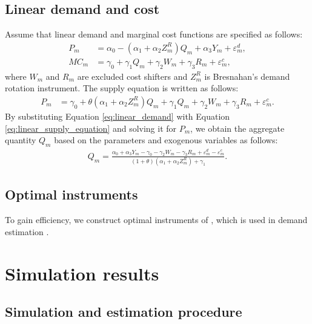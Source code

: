 \documentclass[11pt, a4paper]{article}
\begin{document}
\subsection{Linear demand and cost}
Assume that linear demand and marginal cost functions are specified as follows:
\begin{align}
    P_m &= \alpha_0 - (\alpha_1 + \alpha_2Z^{R}_{m})Q_{m} + \alpha_3 Y_m + \varepsilon^{d}_{m},\label{eq:linear_demand}\\
    MC_m &= \gamma_0  + \gamma_1 Q_{m} + \gamma_2 W_{m} + \gamma_3 R_{m} + \varepsilon^{c}_{m},\label{eq:linear_marginal_cost}
\end{align}
where $W_{m}$ and $R_{m}$ are excluded cost shifters and $Z^{R}_{m}$ is Bresnahan's demand rotation instrument. 
The supply equation is written as follows:
\begin{align}
    P_m 
    &= \gamma_0 + \theta (\alpha_1 + \alpha_2 Z^{R}_m)Q_{m} + \gamma_1 Q_{m} + \gamma_2 W_m + \gamma_3 R_{m} +\varepsilon^c_m.\label{eq:linear_supply_equation}\end{align}
By substituting Equation \eqref{eq:linear_demand} with Equation \eqref{eq:linear_supply_equation} and solving it for $P_m$, we obtain the aggregate quantity $Q_{m}$ based on the parameters and exogenous variables as follows:
\begin{align}
    Q_{m} =  \frac{\alpha_0 + \alpha_3 Y_m - \gamma_0 - \gamma_2 W_{m} - \gamma_3 R_{m} + \varepsilon^{d}_{m} - \varepsilon^{c}_{m}}{(1 + \theta) (\alpha_1 + \alpha_2 Z^{R}_{m}) + \gamma_1}.\label{eq:quantity_linear}
\end{align}

\subsection{Optimal instruments}

To gain efficiency, we construct optimal instruments of \cite{chamberlain1987asymptotic}, which is used in demand estimation \citep{reynaert2014improving}.


\section{Simulation results}\label{sec:results}

\subsection{Simulation and estimation procedure}
\end{document}
